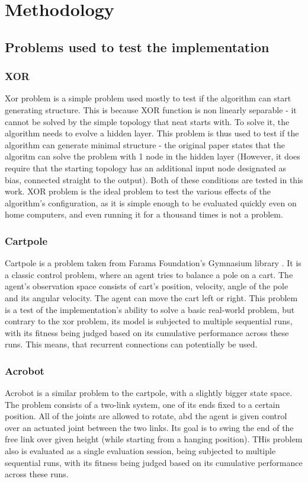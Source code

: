 \documentclass{article}
\begin{document}
\section{Methodology}
    \subsection{Problems used to test the implementation}
        \subsubsection{XOR}
        Xor problem is a simple problem used mostly to test if the algorithm can start generating structure. 
        This is because XOR function is non linearly separable - it cannot be solved by the simple topology that neat starts with.
        To solve it, the algorithm needs to evolve a hidden layer. 
        This problem is thus used to test if the algorithm can generate minimal structure - the original paper \cite{originalNeat}
        states that the algoritm can solve the problem with 1 node in the hidden layer (However,
        it does require that the starting topology has an additional input node designated
        as bias, connected straight to the output). Both of these conditions are tested in this work.
        XOR problem is the ideal problem to test the various effects of the algorithm's configuration, as it is simple enough to be
        evaluated quickly even on home computers, and even running it for a thousand times is not a problem.
        \subsubsection{Cartpole}
        Cartpole is a problem taken from Farama Foundation's Gymnasium library \cite{gymnasium}. It is a classic control problem, 
        where an agent tries to balance a pole on a cart. The agent's observation space consists of cart's 
        position, velocity, angle of the pole and its angular velocity. The agent can move the cart left or right.
        This problem is a test of the implementation's ability to solve a basic real-world problem, but contrary 
        to the xor problem, its model is subjected to multiple sequential runs,
        with its fitness being judged based on its cumulative performance across these runs. This means, that
        recurrent connections can potentially be used.
        \subsubsection{Acrobot}
        Acrobot is a similar problem to the cartpole, with a slightly bigger state space. The problem consists
        of a two-link system, one of its ends fixed to a certain position. All of the joints are allowed to rotate,
        abd the agent is given control over an actuated joint between the two links. Its goal is to swing the
        end of the free link over given height (while starting from a hanging position). 
        THis problem also is evaluated as a single evaluation session, being subjected to multiple sequential runs,
        with its fitness being judged based on its cumulative performance across these runs.
\end{document}
